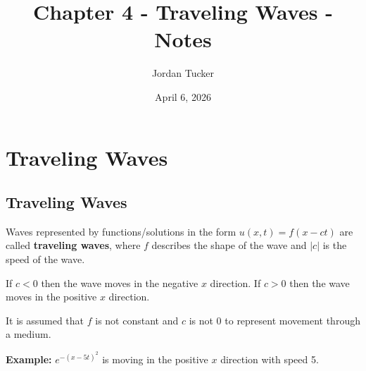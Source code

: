 \documentclass[12pt, letterpaper]{article}
\title{Chapter 4 - Traveling Waves - Notes}
\author{Jordan Tucker}
\date{April 6, 2026}
\begin{document}
    \maketitle
    \section{Traveling Waves}\label{sec:traveling-waves}

    \subsection{Traveling Waves}\label{subsec:traveling-waves}
    Waves represented by functions/solutions in the form $u(x,t) = f(x-ct)$ are called
    \textbf{traveling waves}, where $f$ describes the shape of the wave and $|c|$ is the speed of
    the wave.

    If $c<0$ then the wave moves in the negative $x$ direction.
    If $c>0$ then the wave moves in the positive $x$ direction.

    It is assumed that $f$ is not constant and $c$ is not 0 to represent movement through a medium.

    \textbf{Example:} $e^{-(x-5t)^2}$ is moving in the positive $x$ direction with speed 5.
    
\end{document}
